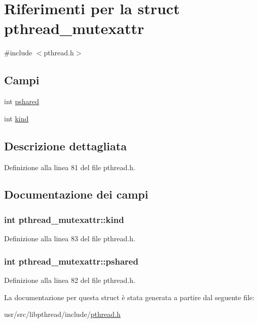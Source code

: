 \hypertarget{structpthread__mutexattr}{\section{Riferimenti per la struct pthread\+\_\+mutexattr}
\label{structpthread__mutexattr}
}


{\ttfamily \#include $<$pthread.\+h$>$}

\subsection*{Campi}
\begin{DoxyCompactItemize}
\item 
int \hyperlink{structpthread__mutexattr_a886b6893f8e2ac727baa10ae3d5433a8}{pshared}
\item 
int \hyperlink{structpthread__mutexattr_a8f33b94daf83faf08982414db0b16a0c}{kind}
\end{DoxyCompactItemize}


\subsection{Descrizione dettagliata}


Definizione alla linea 81 del file pthread.\+h.



\subsection{Documentazione dei campi}
\hypertarget{structpthread__mutexattr_a8f33b94daf83faf08982414db0b16a0c}{
\subsubsection[{kind}]{\setlength{\rightskip}{0pt plus 5cm}int pthread\+\_\+mutexattr\+::kind}}\label{structpthread__mutexattr_a8f33b94daf83faf08982414db0b16a0c}


Definizione alla linea 83 del file pthread.\+h.

\hypertarget{structpthread__mutexattr_a886b6893f8e2ac727baa10ae3d5433a8}{
\subsubsection[{pshared}]{\setlength{\rightskip}{0pt plus 5cm}int pthread\+\_\+mutexattr\+::pshared}}\label{structpthread__mutexattr_a886b6893f8e2ac727baa10ae3d5433a8}


Definizione alla linea 82 del file pthread.\+h.



La documentazione per questa struct è stata generata a partire dal seguente file\+:\begin{DoxyCompactItemize}
\item 
usr/src/libpthread/include/\hyperlink{pthread_8h}{pthread.\+h}\end{DoxyCompactItemize}
